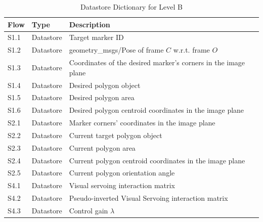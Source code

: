 \begin{table}[!h]
	\caption{Datastore Dictionary for Level B}
	\label{tab:DD-LB-b}
	\centering
	\begin{tabular}{lll}
		\toprule
		Flow & Type & Description \\
		\midrule
		S1.1 & Datastore & Target marker ID \\
		S1.2 & Datastore & geometry\_msgs/Pose of frame $C$ w.r.t. frame $O$ \\
		S1.3 & Datastore & Coordinates of the desired marker's corners in the image plane \\
		S1.4 & Datastore & Desired polygon object \\
		S1.5 & Datastore & Desired polygon area \\
		S1.6 & Datastore & Desired polygon centroid coordinates in the image plane \\
		S2.1 & Datastore & Marker corners' coordinates in the image plane \\
		S2.2 & Datastore & Current target polygon object  \\
		S2.3 & Datastore & Current polygon area \\
		S2.4 & Datastore & Current polygon centroid coordinates in the image plane \\
		S2.5 & Datastore & Current polygon orientation angle \\	
		S4.1 & Datastore & Visual servoing interaction matrix \\	
		S4.2 & Datastore & Pseudo-inverted Visual Servoing interaction matrix \\
		S4.3 & Datastore & Control gain $\lambda$ \\
		\bottomrule
	\end{tabular}
\end{table}